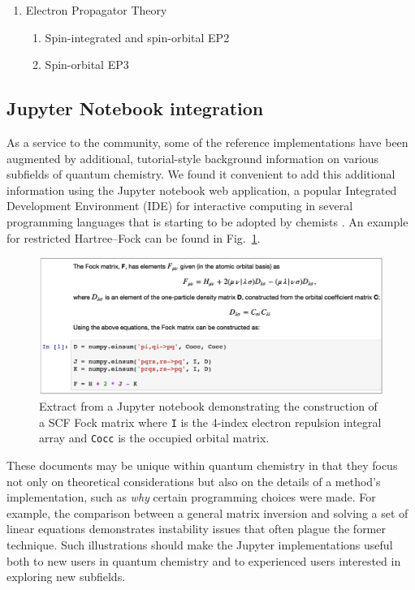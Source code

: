 \begin{enumerate}
\item Electron Propagator Theory
    \begin{enumerate}
    \item Spin-integrated and spin-orbital EP2
    \item Spin-orbital EP3
    \end{enumerate}


\end{enumerate}


\subsection{Jupyter Notebook integration}

As a service to the community, some of the reference implementations have been augmented by additional, tutorial-style background information on various subfields of quantum chemistry.  We found it convenient to add this additional information using the Jupyter notebook web application,\cite{Granger:1521-9615} a popular Integrated Development Environment (IDE) for interactive computing in several programming languages that is starting to be adopted by chemists \cite{charles:2017:592}.  An example for restricted Hartree--Fock can be found in Fig.~\ref{fig:ipython}.

\begin{figure}[H]
  \includegraphics[scale=0.25]{paper_05/fig2.png}
  \caption{Extract from a Jupyter notebook demonstrating the construction of a SCF Fock matrix where {\tt I} is the 4-index electron repulsion integral array and {\tt Cocc} is the occupied orbital matrix.}
  \label{fig:ipython}
\end{figure}

These documents may be unique within quantum chemistry in that they focus not only on theoretical considerations but also on the details of a method's implementation, such as \emph{why} certain programming choices were made. For example, the comparison between a general matrix inversion and solving a set of linear equations demonstrates instability issues that often plague the former technique. Such illustrations should make the Jupyter implementations useful both to new users in quantum chemistry and to experienced users interested in exploring new subfields.

